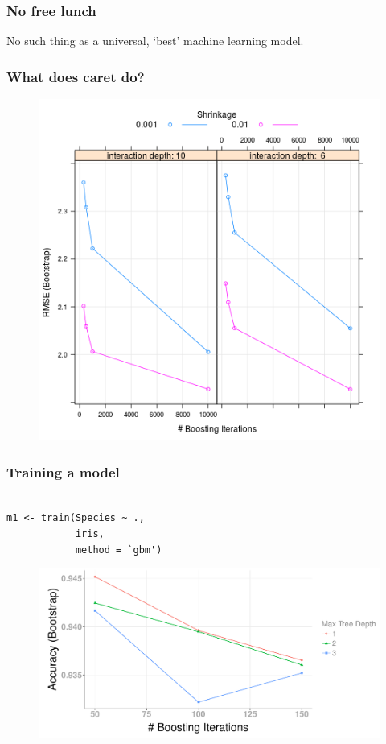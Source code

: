 \documentclass[handout, aspectratio = 169]{beamer}
\begin{document}
\begin{frame}
\frametitle{No free lunch}
No such thing as a universal, `best' machine learning model.
\end{frame} 








\begin{frame}
\frametitle{What does caret do?}
\begin{figure}
    \includegraphics[height = 0.8\textheight]{gbm2opt}
\end{figure} 
\end{frame} 






\begin{frame}[fragile]
\frametitle{Training a model}
\begin{Verbatim}

m1 <- train(Species ~ ., 
            iris,
            method = `gbm')

\end{Verbatim}

\begin{figure}
    \includegraphics[height = 0.5\textheight]{train_gbm}
\end{figure} 
\end{frame} 
\end{document}
